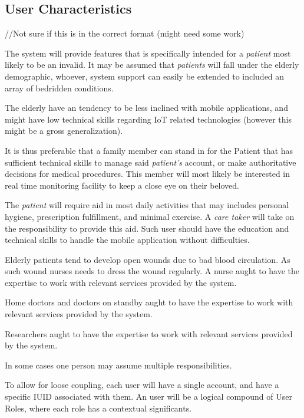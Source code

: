 \subsection{User Characteristics}

//Not sure if this is in the correct format (might need some work)

The system will provide features that is specifically intended for a \textit{patient} most likely to be an invalid. It may be assumed that \textit{patients} will fall under the elderly demographic, whoever, system support can easily be extended to included an array of bedridden conditions.

The elderly have an tendency to be less inclined with mobile applications, and might have low technical skills regarding IoT related technologies (however this might be a gross generalization).

It is thus preferable that a family member can stand in for the Patient that has sufficient technical skills to manage said \textit{patient's} account, or make authoritative decisions for medical procedures. This member will most likely be interested in real time monitoring facility to keep a close eye on their beloved.

The \textit{patient} will require aid in most daily activities that may includes personal hygiene, prescription fulfillment, and minimal exercise. A \textit{care taker} will take on the responsibility to provide this aid. Such user should have the education and technical skills to handle the mobile application without difficulties.

Elderly patients tend to develop open wounds due to bad blood circulation. As such wound nurses needs to dress the wound regularly. A nurse aught to have the expertise to work with relevant services provided by the system.

Home doctors and doctors on standby aught to have the expertise to work with relevant services provided by the system.

Researchers aught to have the expertise to work with relevant services provided by the system.

In some cases one person may assume multiple responsibilities.

To allow for loose coupling, each user will have a single account, and have a specific IUID associated with them. An user will be a logical compound of User Roles, where each role has a contextual significants.

